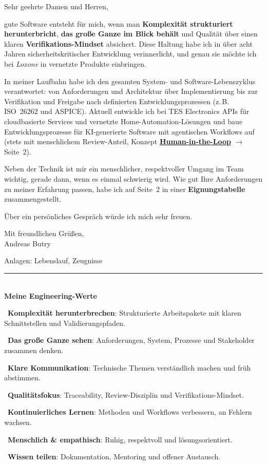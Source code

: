 \documentclass[10pt,a4paper]{moderncv}   %
\begin{document}
\medskip

Sehr geehrte Damen und Herren,

\medskip

gute Software entsteht für mich, wenn man \textbf{Komplexität strukturiert
herunterbricht}, \textbf{das große Ganze im Blick behält} und Qualität über einen
klaren \textbf{Verifikations-Mindset} absichert. Diese Haltung habe ich in über
acht Jahren sicherheitskritischer Entwicklung verinnerlicht, und genau sie möchte
ich bei \emph{Loxone} in vernetzte Produkte einbringen.

In meiner Laufbahn habe ich den gesamten System- und Software-Lebenszyklus
verantwortet: von Anforderungen und Architektur über Implementierung bis zur
Verifikation und Freigabe nach definierten Entwicklungsprozessen (z.\,B.
ISO~26262 und ASPICE). Aktuell entwickle ich bei
TES Electronics APIs für cloudbasierte Services und vernetzte
Home-Automation-Lösungen und baue Entwicklungsprozesse für KI-generierte
Software mit agentischen Workflows auf (stets mit menschlichem Review-Anteil,
Konzept \hyperlink{hitl}{\textbf{Human-in-the-Loop}} $\rightarrow$ Seite~2).

Neben der Technik ist mir ein menschlicher, respektvoller Umgang im Team wichtig,
gerade dann, wenn es einmal schwierig wird. Wie gut Ihre Anforderungen zu meiner
Erfahrung passen, habe ich auf Seite~2 in einer \textbf{Eignungstabelle}
zusammengestellt.

Über ein persönliches Gespräch würde ich mich sehr freuen.

\bigskip
Mit freundlichen Grüßen,\\[2.0em]
Andreas Butry

\medskip
{\small\color{light}Anlagen: Lebenslauf, Zeugnisse}

\medskip
{\color{accent}\rule{\linewidth}{0.6pt}}\\[3pt]
{\small\bfseries\color{accent}Meine Engineering-Werte}\par\smallskip
{\small
\newcommand{\valitem}[3]{\par\noindent{\color{accent}#1}~\textbf{#2}: #3\par\vspace{1.5pt}}
\valitem{\faSitemap}{Komplexität herunterbrechen}{Strukturierte Arbeitspakete mit klaren Schnittstellen und Validierungspfaden.}
\valitem{\faDiagramProject}{Das große Ganze sehen}{Anforderungen, System, Prozesse und Stakeholder zusammen denken.}
\valitem{\faComments}{Klare Kommunikation}{Technische Themen verständlich machen und früh abstimmen.}
\valitem{\faCheckDouble}{Qualitätsfokus}{Traceability, Review-Disziplin und Verifikations-Mindset.}
\valitem{\faSeedling}{Kontinuierliches Lernen}{Methoden und Workflows verbessern, an Fehlern wachsen.}
\valitem{\faHandsHolding}{Menschlich \& empathisch}{Ruhig, respektvoll und lösungsorientiert.}
\valitem{\faShare}{Wissen teilen}{Dokumentation, Mentoring und offener Austausch.}
}
\end{document}
